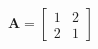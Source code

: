 \documentclass[preview]{standalone}
\begin{document}
\begin{align*}
\mathbf{A} = \begin{bmatrix} 1 & 2 \\ 2 & 1 \end{bmatrix}
\end{align*}
\end{document}

